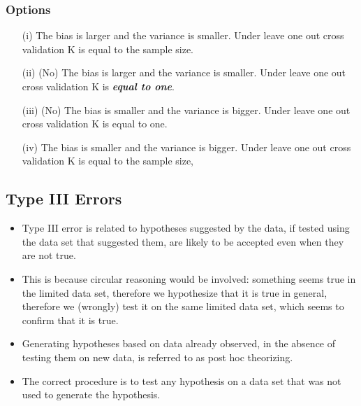 \documentclass[caret-main.tex]{subfiles}
\begin{document}
\subsubsection*{Options}

\begin{itemize}
\item[(i)]The bias is larger and the variance is smaller. Under leave one out cross validation K is equal to the sample size.			
\item[(ii)] (No) The bias is larger and the variance is smaller. Under leave one out cross validation K is \textbf{\textit{equal to one}}.			
\item[(iii)] (No) The bias is smaller and the variance is bigger. Under leave one out cross validation K is equal to one.
\item[(iv)] The bias is smaller and the variance is bigger. Under leave one out cross validation K is equal to the sample size,
\end{itemize}
\newpage

\newpage
\subsection{Type III Errors}

\begin{itemize}
\item Type III error is related to hypotheses suggested by the data, if tested using the data set that suggested them, are likely to be accepted even when they are not true. 

\item This is because circular reasoning would be involved: something seems true in the limited data set, therefore we hypothesize that it is true in general, therefore we (wrongly) test it on the same limited data set, which seems to confirm that it is true. 

\item Generating hypotheses based on data already observed, in the absence of testing them on new data, is referred to as post hoc theorizing.


\item The correct procedure is to test any hypothesis on a data set that was not used to generate the hypothesis.
\end{itemize}
\end{document}
